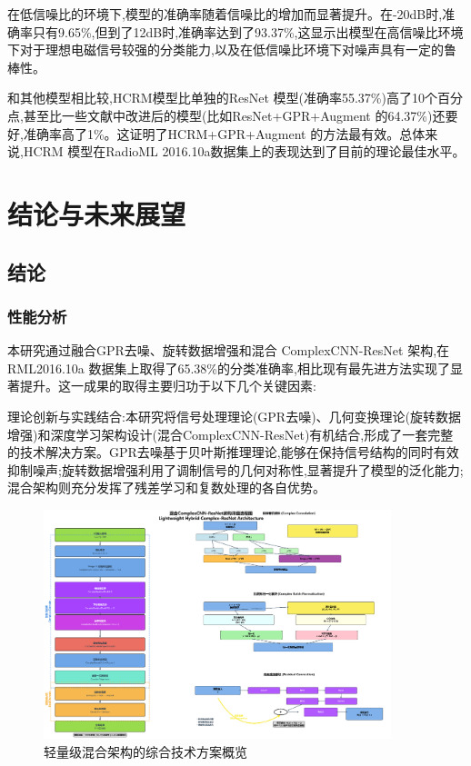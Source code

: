 \documentclass{article}
\begin{document}
\begin{CJK}{UTF8}{gbsn}
在低信噪比的环境下,模型的准确率随着信噪比的增加而显著提升。在-20dB时,准确率只有9.65\%,但到了12dB时,准确率达到了93.37\%,这显示出模型在高信噪比环境下对于理想电磁信号较强的分类能力,以及在低信噪比环境下对噪声具有一定的鲁棒性。

和其他模型相比较,HCRM模型比单独的ResNet 模型(准确率55.37\%)高了10个百分点,甚至比一些文献中改进后的模型(比如ResNet+GPR+Augment 的64.37\%)还要好,准确率高了1\%。这证明了HCRM+GPR+Augment 的方法最有效。总体来说,HCRM 模型在RadioML 2016.10a数据集上的表现达到了目前的理论最佳水平。

\newpage
\section{结论与未来展望}

\subsection{结论}
\subsubsection{性能分析}
本研究通过融合GPR去噪、旋转数据增强和混合 ComplexCNN-ResNet 架构,在RML2016.10a 数据集上取得了65.38\%的分类准确率,相比现有最先进方法实现了显著提升。这一成果的取得主要归功于以下几个关键因素:

理论创新与实践结合:本研究将信号处理理论(GPR去噪)、几何变换理论(旋转数据增强)和深度学习架构设计(混合ComplexCNN-ResNet)有机结合,形成了一套完整的技术解决方案。GPR去噪基于贝叶斯推理理论,能够在保持信号结构的同时有效抑制噪声;旋转数据增强利用了调制信号的几何对称性,显著提升了模型的泛化能力;混合架构则充分发挥了残差学习和复数处理的各自优势。

\begin{figure}[H]
    \centering
    \includegraphics[width=0.9\textwidth]{figure/image20.png}
    \caption{轻量级混合架构的综合技术方案概览}
    \label{fig:hybrid_solution_overview}
\end{figure}


\end{CJK}
\end{document}
